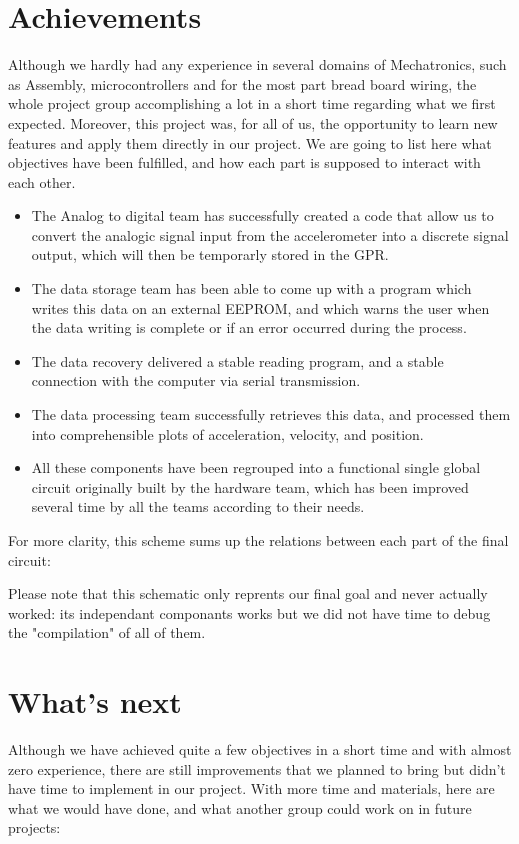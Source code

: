\documentclass[12pt]{article}
\begin{document}
\newpage
\section{Achievements}
	Although we hardly had any experience in several domains of Mechatronics, such as Assembly, microcontrollers and for the most part bread board wiring, the whole project group accomplishing a lot in a short time regarding what we first expected. Moreover, this project was, for all of us, the opportunity to learn new features and apply them directly in our project. We are going to list here what objectives have been fulfilled, and how each part is supposed to interact with each other.\\

	\begin{itemize}
		\item The Analog to digital team has successfully created a code that allow us to convert the analogic signal input from the accelerometer into a discrete signal output, which will then be temporarly stored in the GPR.
		\item The data storage team has been able to come up with a program which writes this data on an external EEPROM, and which warns the user when the data writing is complete or if an error occurred during the process.
		\item The data recovery delivered a stable reading program, and a stable connection with the computer via serial transmission.
		\item The data processing team successfully retrieves this data, and processed them into comprehensible plots of acceleration, velocity, and position.
		\item All these components have been regrouped into a functional single global circuit originally built by the hardware team, which has been improved several time by all the teams according to their needs.
	\end{itemize}

	For more clarity, this scheme sums up the relations between each part of the final circuit:\\


	Please note that this schematic only reprents our final goal and never actually worked: its independant componants works but we did not have time to debug the "compilation" of all of them.

\newpage
\section{What's next}
	Although we have achieved quite a few objectives in a short time and with almost zero experience, there are still improvements that we planned to bring but didn’t have time to implement in our project. With more time and materials, here are what we would have done, and what another group could work on in future projects:\\
\end{document}
